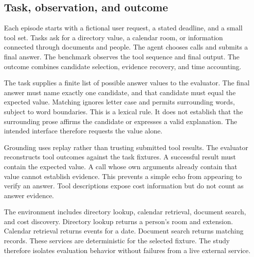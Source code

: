 \documentclass{article}
\begin{document}
\subsection{Task, observation, and outcome}
Each episode starts with a fictional user request, a stated deadline, and a small tool set. Tasks ask for a directory value, a calendar room, or information connected through documents and people. The agent chooses calls and submits a final answer. The benchmark observes the tool sequence and final output. The outcome combines candidate selection, evidence recovery, and time accounting.\par
The task supplies a finite list of possible answer values to the evaluator. The final answer must name exactly one candidate, and that candidate must equal the expected value. Matching ignores letter case and permits surrounding words, subject to word boundaries. This is a lexical rule. It does not establish that the surrounding prose affirms the candidate or expresses a valid explanation. The intended interface therefore requests the value alone.\par
Grounding uses replay rather than trusting submitted tool results. The evaluator reconstructs tool outcomes against the task fixtures. A successful result must contain the expected value. A call whose own arguments already contain that value cannot establish evidence. This prevents a simple echo from appearing to verify an answer. Tool descriptions expose cost information but do not count as answer evidence.\par
The environment includes directory lookup, calendar retrieval, document search, and cost discovery. Directory lookup returns a person's room and extension. Calendar retrieval returns events for a date. Document search returns matching records. These services are deterministic for the selected fixture. The study therefore isolates evaluation behavior without failures from a live external service.\par
\end{document}
